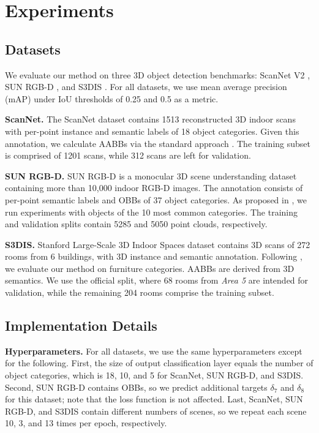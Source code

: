 \documentclass[runningheads]{llncs}
\begin{document}
\section{Experiments}

\subsection{Datasets}

We evaluate our method on three 3D object detection benchmarks: ScanNet V2 \cite{dai2017scannet}, SUN RGB-D \cite{song2015sunrgbd}, and S3DIS \cite{armeni2016s3dis}. For all datasets, we use mean average precision (mAP) under IoU thresholds of 0.25 and 0.5 as a metric.

\textbf{ScanNet.} The ScanNet dataset contains 1513 reconstructed 3D indoor scans with per-point instance and semantic labels of 18 object categories. Given this annotation, we calculate AABBs via the standard approach \cite{qi2019votenet}. The training subset is comprised of 1201 scans, while 312 scans are left for validation.

\textbf{SUN RGB-D.} SUN RGB-D is a monocular 3D scene understanding dataset containing more than 10,000 indoor RGB-D images. The annotation consists of per-point semantic labels and OBBs of 37 object categories. As proposed in \cite{qi2019votenet}, we run experiments with objects of the 10 most common categories. The training and validation splits contain 5285 and 5050 point clouds, respectively.

\textbf{S3DIS.} Stanford Large-Scale 3D Indoor Spaces dataset contains 3D scans of 272 rooms from 6 buildings, with 3D instance and semantic annotation. Following \cite{gwak2020gsdn}, we evaluate our method on furniture categories. AABBs are derived from 3D semantics. We use the official split, where 68 rooms from \textit{Area 5} are intended for validation, while the remaining 204 rooms comprise the training subset.

\subsection{Implementation Details}

\textbf{Hyperparameters.} For all datasets, we use the same hyperparameters except for the following. First, the size of output classification layer equals the number of object categories, which is 18, 10, and 5 for ScanNet, SUN RGB-D, and S3DIS. Second, SUN RGB-D contains OBBs, so we predict additional targets $\delta_7$ and $\delta_8$ for this dataset; note that the loss function is not affected. Last, ScanNet, SUN RGB-D, and S3DIS contain different numbers of scenes, so we repeat each scene 10, 3, and 13 times per epoch, respectively. 
\end{document}
